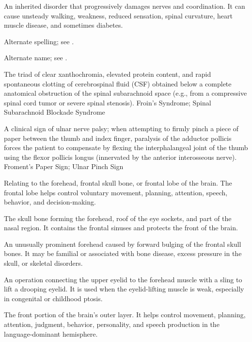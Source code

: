  An inherited disorder that progressively damages nerves and coordination. It can cause unsteady walking, weakness, reduced sensation, spinal curvature, heart muscle disease, and sometimes diabetes.

 Alternate spelling; see .

 Alternate name; see .

 The triad of clear xanthochromia, elevated protein content, and rapid spontaneous clotting of cerebrospinal fluid (CSF) obtained below a complete anatomical obstruction of the spinal subarachnoid space (e.g., from a compressive spinal cord tumor or severe spinal stenosis).
\synonyms
Froin's Syndrome; Spinal Subarachnoid Blockade Syndrome

 A clinical sign of ulnar nerve palsy; when attempting to firmly pinch a piece of paper between the thumb and index finger, paralysis of the adductor pollicis forces the patient to compensate by flexing the interphalangeal joint of the thumb using the flexor pollicis longus (innervated by the anterior interosseous nerve).
\synonyms
Froment's Paper Sign; Ulnar Pinch Sign

 Relating to the forehead, frontal skull bone, or frontal lobe of the brain. The frontal lobe helps control voluntary movement, planning, attention, speech, behavior, and decision-making.

 The skull bone forming the forehead, roof of the eye sockets, and part of the nasal region. It contains the frontal sinuses and protects the front of the brain.

 An unusually prominent forehead caused by forward bulging of the frontal skull bones. It may be familial or associated with bone disease, excess pressure in the skull, or skeletal disorders.

 An operation connecting the upper eyelid to the forehead muscle with a sling to lift a drooping eyelid. It is used when the eyelid-lifting muscle is weak, especially in congenital or childhood ptosis.

 The front portion of the brain’s outer layer. It helps control movement, planning, attention, judgment, behavior, personality, and speech production in the language-dominant hemisphere.

